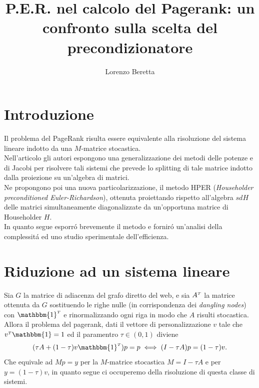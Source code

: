\documentclass[12pt,a4paper]{amsart}
\numberwithin{equation}{section}
\theoremstyle{plain}
\theoremstyle{definition}
\newcommand{\tr}{^{\mathsmaller T}}
\newcommand{\ones}{\mathbbm{1}}
\begin{document}
\title{P.E.R. nel calcolo del Pagerank:   un confronto sulla scelta del precondizionatore}


\author{Lorenzo Beretta}

\maketitle

\section{Introduzione} Il problema del PageRank risulta essere equivalente alla risoluzione del sistema lineare indotto da una $M$-matrice stocastica.\\
Nell'articolo \cite{Tudisco} gli autori espongono una generalizzazione dei metodi delle potenze e di Jacobi per risolvere tali sistemi che prevede lo splitting di tale matrice indotto dalla proiezione su un'algebra di matrici.\\
Ne propongono poi una nuova particolarizzazione, il metodo HPER (\textit{Householder preconditioned Euler-Richardson}), ottenuta proiettando rispetto all'algebra $sdH$ delle matrici simultaneamente diagonalizzate da un'opportuna matrice di Householder $H$. \\ In quanto segue esporr\'o brevemente il metodo e fornir\'o un'analisi della complessit\'a ed uno studio sperimentale dell'efficienza.

\section{Riduzione ad un sistema lineare}

Sia $G$ la matrice di adiacenza del grafo diretto del web, e sia $A\tr$ la matrice ottenuta da $G$ sostituendo le righe nulle (in corrispondenza dei \textit{dangling nodes}) con $\ones\tr$  e rinormalizzando ogni riga in modo che $A$ risulti stocastica.\\
Allora il problema del pagerank, dati il vettore di personalizzazione $v$ tale che $v\tr\ones=1$ ed il paramentro $\tau \in \left(0,1\right)$ diviene
\begin{equation}
(\tau A + (1-\tau) v \ones\tr)p=p \iff (I-\tau A)p=(1-\tau)v.
\label{sistema}
\end{equation}
Che equivale ad $Mp=y$ per la $M$-matrice stocastica  $M=I-\tau A$ e per $y=(1-\tau)v$, in quanto segue ci occuperemo della risoluzione di questa classe di sistemi.
\end{document}

